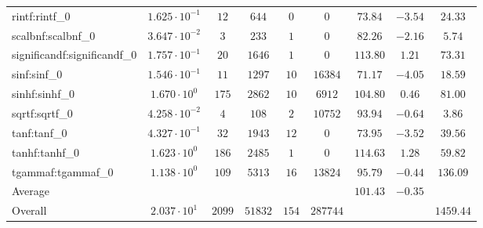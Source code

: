 \begin{tabular}{|l|c|c|c|c|c|c|c|c|}
rintf:rintf\_0               & $ 1.625 \cdot 10^{-1} $ & $ 12     $ & $ 644   $ & $ 0   $ & $ 0      $ & $ 73.84       $ & $ -3.54   $ & $ 24.33   $ \\
scalbnf:scalbnf\_0           & $ 3.647 \cdot 10^{-2} $ & $ 3      $ & $ 233   $ & $ 1   $ & $ 0      $ & $ 82.26       $ & $ -2.16   $ & $ 5.74    $ \\
significandf:significandf\_0 & $ 1.757 \cdot 10^{-1} $ & $ 20     $ & $ 1646  $ & $ 1   $ & $ 0      $ & $ 113.80      $ & $ 1.21    $ & $ 73.31   $ \\
sinf:sinf\_0                 & $ 1.546 \cdot 10^{-1} $ & $ 11     $ & $ 1297  $ & $ 10  $ & $ 16384  $ & $ 71.17       $ & $ -4.05   $ & $ 18.59   $ \\
sinhf:sinhf\_0               & $ 1.670 \cdot 10^{0}  $ & $ 175    $ & $ 2862  $ & $ 10  $ & $ 6912   $ & $ 104.80      $ & $ 0.46    $ & $ 81.00   $ \\
sqrtf:sqrtf\_0               & $ 4.258 \cdot 10^{-2} $ & $ 4      $ & $ 108   $ & $ 2   $ & $ 10752  $ & $ 93.94       $ & $ -0.64   $ & $ 3.86    $ \\
tanf:tanf\_0                 & $ 4.327 \cdot 10^{-1} $ & $ 32     $ & $ 1943  $ & $ 12  $ & $ 0      $ & $ 73.95       $ & $ -3.52   $ & $ 39.56   $ \\
tanhf:tanhf\_0               & $ 1.623 \cdot 10^{0}  $ & $ 186    $ & $ 2485  $ & $ 1   $ & $ 0      $ & $ 114.63      $ & $ 1.28    $ & $ 59.82   $ \\
tgammaf:tgammaf\_0           & $ 1.138 \cdot 10^{0}  $ & $ 109    $ & $ 5313  $ & $ 16  $ & $ 13824  $ & $ 95.79       $ & $ -0.44   $ & $ 136.09  $ \\
\hline
Average                      & $                     $ & $        $ & $       $ & $     $ & $        $ & $ 101.43      $ & $ -0.35   $ & $         $ \\
\hline
Overall                      & $ 2.037 \cdot 10^{1}  $ & $ 2099   $ & $ 51832 $ & $ 154 $ & $ 287744 $ & $             $ & $         $ & $ 1459.44 $ \\
\hline
\end{tabular}
